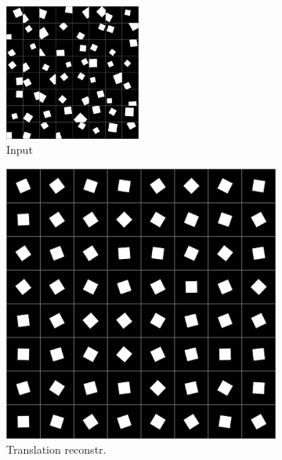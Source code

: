 \documentclass[10pt,a4paper]{article}
\begin{document}
\begin{figure}[!ht]
    \centering
    \begin{subfigure}{\textwidth}
        \centering
        \includegraphics[width=0.49\textwidth] {square_input.png}
        \caption{Input}
        \label{sq_in}
    \end{subfigure}
    \begin{subfigure}{0.49\textwidth}
        \centering
        \includegraphics[width=\textwidth] {square_output0.png}
        \caption{Translation reconstr.}
        \label{sq_trec}
    \end{subfigure}
    \begin{subfigure}{0.49\textwidth}
        \centering	

\end{subfigure}
\end{figure}
\end{document}
